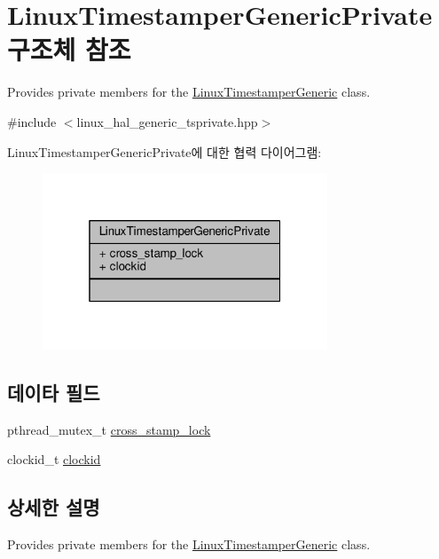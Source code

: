 \hypertarget{struct_linux_timestamper_generic_private}{}\section{Linux\+Timestamper\+Generic\+Private 구조체 참조}
\label{struct_linux_timestamper_generic_private}


Provides private members for the \hyperlink{class_linux_timestamper_generic}{Linux\+Timestamper\+Generic} class.  




{\ttfamily \#include $<$linux\+\_\+hal\+\_\+generic\+\_\+tsprivate.\+hpp$>$}



Linux\+Timestamper\+Generic\+Private에 대한 협력 다이어그램\+:
\nopagebreak
\begin{figure}[H]
\begin{center}
\leavevmode
\includegraphics[width=241pt]{struct_linux_timestamper_generic_private__coll__graph}
\end{center}
\end{figure}
\subsection*{데이타 필드}
\begin{DoxyCompactItemize}
\item 
pthread\+\_\+mutex\+\_\+t \hyperlink{struct_linux_timestamper_generic_private_ae5cec0e25da0e952533ca2644d0040d0}{cross\+\_\+stamp\+\_\+lock}
\item 
clockid\+\_\+t \hyperlink{struct_linux_timestamper_generic_private_a4f74a0f0dc6605cf35e80f22e678c831}{clockid}
\end{DoxyCompactItemize}


\subsection{상세한 설명}
Provides private members for the \hyperlink{class_linux_timestamper_generic}{Linux\+Timestamper\+Generic} class. 

